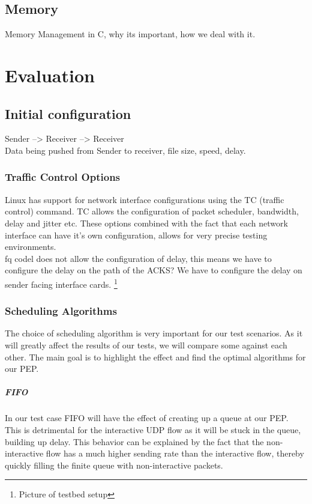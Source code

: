 \documentclass[a4paper,english, 11pt]{report}
\begin{document}
\section{Memory}
Memory Management in C, why its important, how we deal with it.

\chapter{Evaluation}

\section{Initial configuration}

Sender --> Receiver --> Receiver
\\
Data being pushed from Sender to receiver, file size, speed, delay.
\subsection{Traffic Control Options}
Linux has support for network interface configurations using the TC (traffic control) command. TC allows the configuration of packet scheduler, bandwidth, delay and jitter etc. These options combined with the fact that each network interface can have it's own configuration, allows for very precise testing environments. 
\\
fq codel does not allow the configuration of delay, this means we have to configure the delay on the path of the ACKS?
We have to configure the delay on sender facing interface cards. 
\footnote{Picture of testbed setup} 

\subsection{Scheduling Algorithms}
The choice of scheduling algorithm is very important for our test scenarios. As it will greatly affect the results of our tests, we will compare some against each other. The main goal is to highlight the effect and find the optimal algorithms for our PEP.

\paragraph{FIFO}
In our test case FIFO will have the effect of creating up a queue at our PEP. This is detrimental for the interactive UDP flow as it will be stuck in the queue, building up delay. This behavior can be explained by the fact that the non-interactive flow has a much higher sending rate than the interactive flow, thereby quickly filling the finite queue with non-interactive packets.
\end{document}
